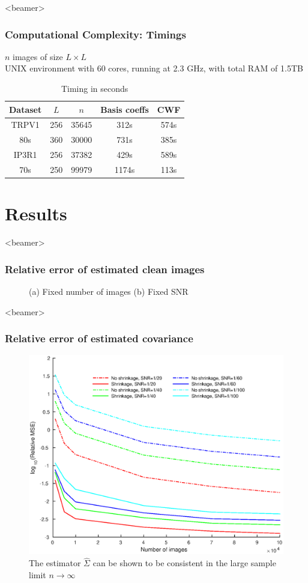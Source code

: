 \documentclass{beamer}
\begin{document}
\begin{frame}<beamer>
\frametitle{Computational Complexity: Timings}
$n$ images of size $L \times L$\\
UNIX environment with 60 cores,
running at 2.3 GHz, with total RAM of 1.5TB


\begin{table}[t]
  \centering
  \caption{Timing in seconds}
  \begin{tabular}{ccccc}
    \toprule
    Dataset & $L$ & $n$ & Basis coeffs  & CWF \\
    \midrule
    TRPV1 & 256 & 35645 & 312s & 574s \\
    80s & 360 & 30000 &  731s & 385s \\
    IP3R1  & 256 & 37382 & 429s & 589s\\
    70s & 250 &  99979 & 1174s & 113s \\
 \bottomrule
  \end{tabular}
\end{table}
\end{frame}

\section{Results}
\begin{frame}<beamer>
\frametitle{Relative error of estimated clean images}

\begin{figure}[]
\centering
{}
\caption{(a) {Fixed number of images}
(b) {Fixed SNR}
}
\end{figure}
\end{frame}

\begin{frame}<beamer>
\frametitle{Relative error of estimated covariance}
\begin{figure}
\centering
\includegraphics[width=0.6\linewidth]{cwf_shrinkage_compare.eps}
\caption{The estimator $\hat \Sigma$ can be shown to be consistent in the large sample limit
$n \to \infty$}
\label{fig:shrinkage}
\end{figure}
\end{frame}
\end{document}
